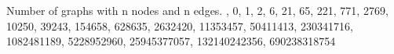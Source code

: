Number of graphs with n nodes and n edges.
, 0, 1, 2, 6, 21, 65, 221, 771, 2769, 10250, 39243, 154658, 628635, 2632420, 11353457, 50411413, 230341716, 1082481189, 5228952960, 25945377057, 132140242356, 690238318754
